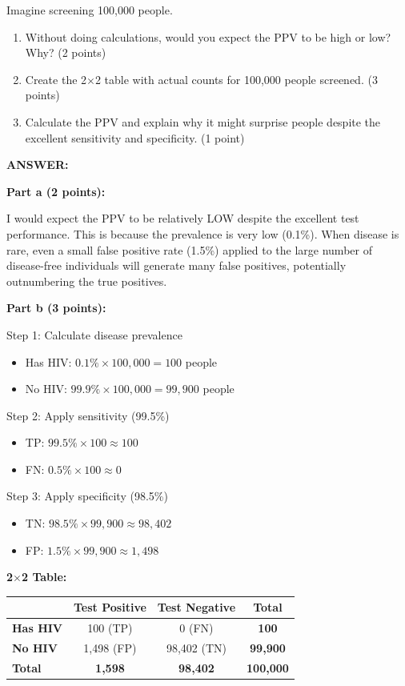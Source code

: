 \documentclass[11pt]{article}
\begin{document}
Imagine screening 100,000 people.

\begin{enumerate}
    \item[a)] Without doing calculations, would you expect the PPV to be high or low? Why? (2 points)
    \item[b)] Create the 2$\times$2 table with actual counts for 100,000 people screened. (3 points)
    \item[c)] Calculate the PPV and explain why it might surprise people despite the excellent sensitivity and specificity. (1 point)
\end{enumerate}

\textbf{ANSWER:}

\textbf{Part a (2 points):}

I would expect the PPV to be relatively LOW despite the excellent test performance. This is because the prevalence is very low (0.1\%). When disease is rare, even a small false positive rate (1.5\%) applied to the large number of disease-free individuals will generate many false positives, potentially outnumbering the true positives.

\textbf{Part b (3 points):}

Step 1: Calculate disease prevalence
\begin{itemize}
    \item Has HIV: $0.1\% \times 100{,}000 = 100$ people
    \item No HIV: $99.9\% \times 100{,}000 = 99{,}900$ people
\end{itemize}

Step 2: Apply sensitivity (99.5\%)
\begin{itemize}
    \item TP: $99.5\% \times 100 \approx 100$
    \item FN: $0.5\% \times 100 \approx 0$
\end{itemize}

Step 3: Apply specificity (98.5\%)
\begin{itemize}
    \item TN: $98.5\% \times 99{,}900 \approx 98{,}402$
    \item FP: $1.5\% \times 99{,}900 \approx 1{,}498$
\end{itemize}

\textbf{2$\times$2 Table:}

\begin{center}
\begin{tabular}{lccc}
\toprule
 & \textbf{Test Positive} & \textbf{Test Negative} & \textbf{Total} \\
\midrule
\textbf{Has HIV} & 100 (TP) & 0 (FN) & \textbf{100} \\
\textbf{No HIV} & 1,498 (FP) & 98,402 (TN) & \textbf{99,900} \\
\midrule
\textbf{Total} & \textbf{1,598} & \textbf{98,402} & \textbf{100,000} \\
\bottomrule
\end{tabular}
\end{center}
\end{document}
